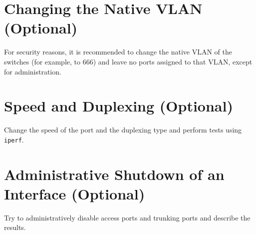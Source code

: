 \section{Changing the Native VLAN (Optional)}

For security reasons, it is recommended to change the native VLAN of the switches (for example, to 666) and leave no ports assigned to that VLAN, except for administration.

\section{Speed and Duplexing (Optional)}

Change the speed of the port and the duplexing type and perform tests using \texttt{\color{blue}iperf}.

\section{Administrative Shutdown of an Interface (Optional)}

Try to administratively disable access ports and trunking ports and describe the results.
